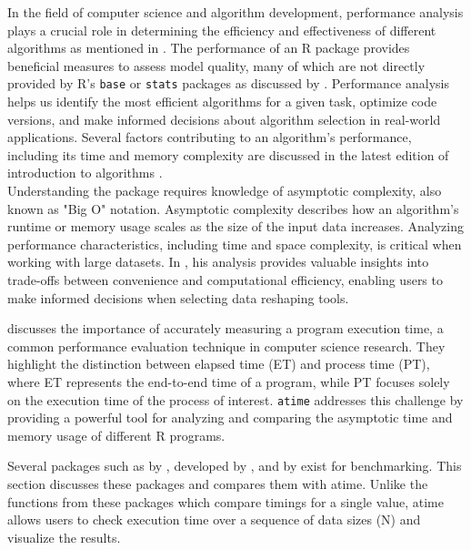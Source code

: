  In the field of computer science and algorithm development, performance analysis plays a crucial role in determining the efficiency and effectiveness of different algorithms as mentioned in \cite{knuth1997art}. The performance of an R package provides beneficial measures to assess model quality, many of which are not directly provided by R's \texttt{base} or \texttt{stats} packages as discussed by \cite{RcoreTeam}. Performance analysis helps us identify the most efficient algorithms for a given task, optimize code versions, and make informed decisions about algorithm selection in real-world applications. Several factors contributing to an algorithm's performance, including its time and memory complexity are discussed in the latest edition of introduction to algorithms \cite{cormen2022introduction}.\\


\noindent Understanding the  package requires knowledge of asymptotic complexity, also known as "Big O" notation. Asymptotic complexity describes how an algorithm's runtime or memory usage scales as the size of the input data increases. Analyzing performance characteristics, including time and space complexity, is critical when working with large datasets. In \cite{Hocking2021}, his analysis provides valuable insights into trade-offs between convenience and computational efficiency, enabling users to make informed decisions when selecting data reshaping tools.
 
\noindent \cite{suh2017emp} discusses the importance of accurately measuring a program execution time, a common performance evaluation technique in computer science research. They highlight the distinction between elapsed time (ET) and process time (PT), where ET represents the end-to-end time of a program, while PT focuses solely on the execution time of the process of interest. \texttt{atime} addresses this challenge by providing a powerful tool for analyzing and comparing the asymptotic time and memory usage of different R programs.


\noindent Several packages such as  by \cite{microbenchmark},  developed by \cite{bench}, and  by \cite{system.time} exist for benchmarking. This section discusses these packages and compares them with atime. Unlike the functions from these packages which compare timings for a single value, atime allows users to check execution time over a sequence of data sizes (N) and visualize the results.\\ 

